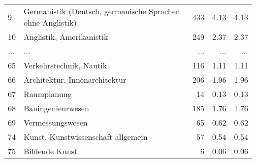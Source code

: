\begin{longtable}{lXrrr}
        9 & \multicolumn{1}{X}{Germanistik (Deutsch, germanische Sprachen ohne Anglistik)} & %
          \num{433} &
          \num[round-mode=places,round-precision=2]{4,13} &
          \num[round-mode=places,round-precision=2]{4,13} \\
        10 & \multicolumn{1}{X}{Anglistik, Amerikanistik} & %
          \num{249} &
          \num[round-mode=places,round-precision=2]{2,37} &
          \num[round-mode=places,round-precision=2]{2,37} \\
       ... & ... & ... & ... & ... \\
        65 & \multicolumn{1}{X}{Verkehrstechnik, Nautik} & %
          \num{116} &
          \num[round-mode=places,round-precision=2]{1,11} &
          \num[round-mode=places,round-precision=2]{1,11} \\

        66 & \multicolumn{1}{X}{Architektur, Innenarchitektur} & %
          \num{206} &
          \num[round-mode=places,round-precision=2]{1,96} &
          \num[round-mode=places,round-precision=2]{1,96} \\

        67 & \multicolumn{1}{X}{Raumplanung} & %
          \num{14} &
          \num[round-mode=places,round-precision=2]{0,13} &
          \num[round-mode=places,round-precision=2]{0,13} \\

        68 & \multicolumn{1}{X}{Bauingenieurwesen} & %
          \num{185} &
          \num[round-mode=places,round-precision=2]{1,76} &
          \num[round-mode=places,round-precision=2]{1,76} \\

        69 & \multicolumn{1}{X}{Vermessungswesen} & %
          \num{65} &
          \num[round-mode=places,round-precision=2]{0,62} &
          \num[round-mode=places,round-precision=2]{0,62} \\

        74 & \multicolumn{1}{X}{Kunst, Kunstwissenschaft allgemein} & %
          \num{57} &
          \num[round-mode=places,round-precision=2]{0,54} &
          \num[round-mode=places,round-precision=2]{0,54} \\

        75 & \multicolumn{1}{X}{Bildende Kunst} & %
          \num{6} &
          \num[round-mode=places,round-precision=2]{0,06} &
          \num[round-mode=places,round-precision=2]{0,06} \\


\end{longtable}
